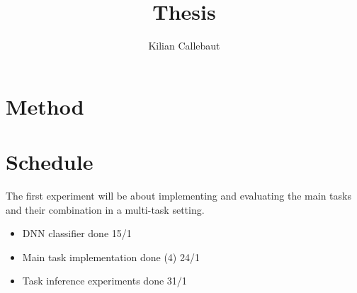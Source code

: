 \documentclass[12pt]{report}
\title{Thesis}
\author{Kilian Callebaut}
\begin{document}
	
	
	\maketitle
	
	\tableofcontents
	
	

	
	
%	
	
	
	\chapter{Method}
	
	
	
	
	
	
	
	
	
	\chapter{Schedule}
	
	
	The first experiment will be about implementing and evaluating the main tasks and their combination in a multi-task setting.
	\begin{itemize}
		\item DNN classifier done 15/1
		\item Main task implementation done (4) 24/1
		\item Task inference experiments done 31/1
	\end{itemize}
	
\end{document}
